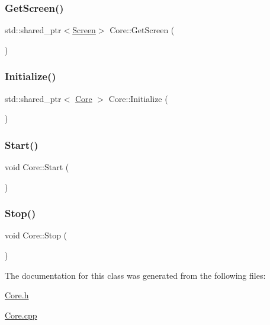 \subsubsection{\texorpdfstring{Get\+Screen()}{GetScreen()}}
{\footnotesize\ttfamily std\+::shared\+\_\+ptr$<$\mbox{\hyperlink{class_screen}{Screen}}$>$ Core\+::\+Get\+Screen (\begin{DoxyParamCaption}{ }\end{DoxyParamCaption})\hspace{0.3cm}{\ttfamily [inline]}}

\mbox{\label{class_core_ab62f686765accb870bbde07184b52bef}} 
\subsubsection{\texorpdfstring{Initialize()}{Initialize()}}
{\footnotesize\ttfamily std\+::shared\+\_\+ptr$<$ \mbox{\hyperlink{class_core}{Core}} $>$ Core\+::\+Initialize (\begin{DoxyParamCaption}{ }\end{DoxyParamCaption})\hspace{0.3cm}{\ttfamily [static]}}

\mbox{\label{class_core_a44f0db8bca5b6fd85f3948250287bdbd}} 
\subsubsection{\texorpdfstring{Start()}{Start()}}
{\footnotesize\ttfamily void Core\+::\+Start (\begin{DoxyParamCaption}{ }\end{DoxyParamCaption})}

\mbox{\label{class_core_acab57c44acf4231e8310d93310667990}} 
\subsubsection{\texorpdfstring{Stop()}{Stop()}}
{\footnotesize\ttfamily void Core\+::\+Stop (\begin{DoxyParamCaption}{ }\end{DoxyParamCaption})}



The documentation for this class was generated from the following files\+:\begin{DoxyCompactItemize}
\item 
\mbox{\hyperlink{_core_8h}{Core.\+h}}\item 
\mbox{\hyperlink{_core_8cpp}{Core.\+cpp}}\end{DoxyCompactItemize}
